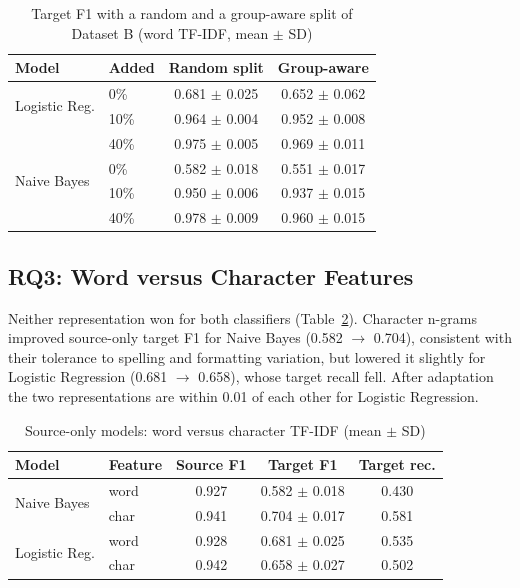 \documentclass[conference]{IEEEtran}
\begin{document}
\begin{table}[t]
\centering
\caption{Target F1 with a random and a group-aware split of Dataset B (word TF-IDF, mean $\pm$ SD)}
\label{tab:group}
\begin{tabular}{llcc}
\toprule
Model & Added & Random split & Group-aware \\
\midrule
\multirow{2}{*}{Logistic Reg.} & 0\% & 0.681 $\pm$ 0.025 & 0.652 $\pm$ 0.062 \\
 & 10\% & 0.964 $\pm$ 0.004 & 0.952 $\pm$ 0.008 \\
 & 40\% & 0.975 $\pm$ 0.005 & 0.969 $\pm$ 0.011 \\
\midrule
\multirow{2}{*}{Naive Bayes} & 0\% & 0.582 $\pm$ 0.018 & 0.551 $\pm$ 0.017 \\
 & 10\% & 0.950 $\pm$ 0.006 & 0.937 $\pm$ 0.015 \\
 & 40\% & 0.978 $\pm$ 0.009 & 0.960 $\pm$ 0.015 \\
\bottomrule
\end{tabular}
\end{table}

\subsection{RQ3: Word versus Character Features}
Neither representation won for both classifiers (Table~\ref{tab:feat}). Character n-grams improved source-only target F1 for Naive Bayes (0.582 $\to$ 0.704), consistent with their tolerance to spelling and formatting variation, but lowered it slightly for Logistic Regression (0.681 $\to$ 0.658), whose target recall fell. After adaptation the two representations are within 0.01 of each other for Logistic Regression.

\begin{table}[t]
\centering
\caption{Source-only models: word versus character TF-IDF (mean $\pm$ SD)}
\label{tab:feat}
\begin{tabular}{llccc}
\toprule
Model & Feature & Source F1 & Target F1 & Target rec. \\
\midrule
\multirow{2}{*}{Naive Bayes} & word & 0.927 & 0.582 $\pm$ 0.018 & 0.430 \\
 & char & 0.941 & 0.704 $\pm$ 0.017 & 0.581 \\
\multirow{2}{*}{Logistic Reg.} & word & 0.928 & 0.681 $\pm$ 0.025 & 0.535 \\
 & char & 0.942 & 0.658 $\pm$ 0.027 & 0.502 \\
\bottomrule
\end{tabular}
\end{table}
\end{document}
